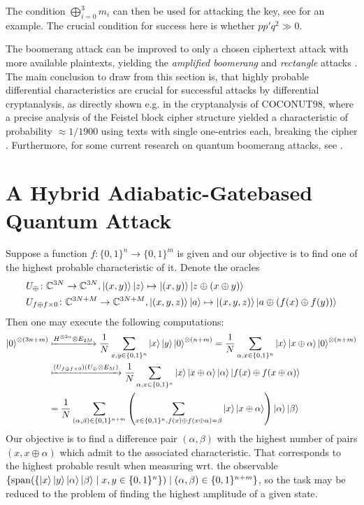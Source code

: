 \documentclass[10pt]{amsart}
\theoremstyle{definition}
\theoremstyle{remark}
\DeclareMathOperator{\Span}{span}
\begin{document}
    The condition \(\bigoplus_{i=0}^3 m_i\) can then be used for attacking the key, see \cite[pp. 161-162]{Wagner_1999} for an example. The crucial condition for success here is whether \(pp'q^2 \gg 0\).
    
    The boomerang attack can be improved to only a chosen ciphertext attack with more available plaintexts, yielding the \emph{amplified boomerang} and \emph{rectangle} attacks \cite[pp. 164-165]{Knudsen}. The main conclusion to draw from this section is, that highly probable differential characteristics are crucial for successful attacks by differential cryptanalysis, as directly shown e.g. in the cryptanalysis of COCONUT98, where a precise analysis of the Feistel block cipher structure yielded a characteristic of probability \(\approx 1/1900\) using texts with single one-entries each, breaking the cipher \cite[pp. 160-161]{Wagner_1999}. Furthermore, for some current research on quantum boomerang attacks, see \cite{Frixons_2022, Zou_2023}.

    \section{A Hybrid Adiabatic-Gatebased Quantum Attack} Suppose a function \(f\colon \{0, 1\}^n \to \{0, 1\}^m\) is given and our objective is to find one of the highest probable characteristic of it. Denote the oracles
    \begin{align}
        &U_{\oplus}\colon \mathbb{C}^{3N} \to \mathbb{C}^{3N}, \ket{(x, y)}\ket{z} \mapsto \ket{(x, y)}\ket{z \oplus (x \oplus y)}\\
        &U_{f \oplus f \times 0}\colon \mathbb{C}^{3N+M} \to \mathbb{C}^{3N+M}, \ket{(x, y, z)}\ket{a} \mapsto \ket{(x, y, z)}\ket{a \oplus (f(x) \oplus f(y))}
    \end{align}
    Then one may execute the following computations:
    \begin{align}
        \ket{0}^{\otimes (3n+m)} &\xmapsto{H^{\otimes 2n} \otimes E_{2M}} \frac{1}{N} \sum_{x, y \in \{0, 1\}^n} \ket{x}\ket{y}\ket{0}^{\otimes (n+m)} = \frac{1}{N} \sum_{\alpha, x \in \{0, 1\}^n} \ket{x}\ket{x \oplus \alpha}\ket{0}^{\otimes (n+m)}\\
        &\xmapsto{(U_{f \oplus f \times 0}) (U_{\oplus} \otimes E_M)} \frac{1}{N} \sum_{\alpha, x \in \{0, 1\}^n} \ket{x}\ket{x \oplus \alpha}\ket{\alpha}\ket{f(x) \oplus f(x \oplus \alpha)}\\
        &= \frac{1}{N}\sum_{(\alpha, \beta) \in \{0, 1\}^{n+m}} \left(\sum_{x \in \{0, 1\}^n, f(x) \oplus f(x \oplus \alpha) = \beta} \ket{x}\ket{x \oplus \alpha}\right)\ket{\alpha}\ket{\beta}
    \end{align}
    Our objective is to find a difference pair \((\alpha, \beta)\) with the highest number of pairs \((x, x \oplus \alpha)\) which admit to the associated characteristic. That corresponds to the highest probable result when measuring wrt. the observable \(\{\Span(\{\ket{x}\ket{y}\ket{\alpha}\ket{\beta} \mid x, y \in \{0, 1\}^n\}) \mid (\alpha, \beta) \in \{0, 1\}^{n + m}\}\), so the task may be reduced to the problem of finding the highest amplitude of a given state.
\end{document}
